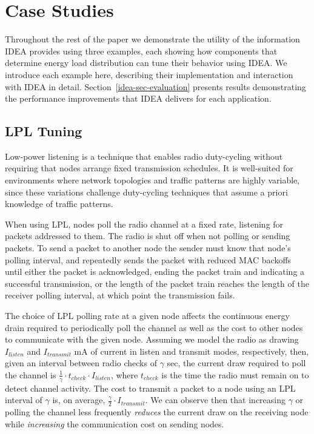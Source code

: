 \section{Case Studies}
\label{idea-sec-casestudies}

Throughout the rest of the paper we demonstrate the utility of the
information IDEA provides using three examples, each showing how components
that determine energy load distribution can tune their behavior using IDEA.
We introduce each example here, describing their implementation and
interaction with IDEA in detail. Section~\ref{idea-sec-evaluation} presents
results demonstrating the performance improvements that IDEA delivers for
each application.

\subsection{LPL Tuning}
\label{idea-subsec-lpltuning}

Low-power listening is a technique that enables radio duty-cycling without
requiring that nodes arrange fixed transmission schedules. It is well-suited
for environments where network topologies and traffic patterns are
highly variable, since these variations challenge duty-cycling techniques
that assume a priori knowledge of traffic patterns.

When using LPL, nodes poll the radio channel at a fixed rate, listening for
packets addressed to them. The radio is shut off when not polling or
sending packets. To send a packet to another node the sender must know that
node's polling interval, and repeatedly sends the packet with reduced MAC
backoffs until either the packet is acknowledged, ending the packet train and
indicating a successful transmission, or the length of the packet train
reaches the length of the receiver polling interval, at which point the
transmission fails.

The choice of LPL polling rate at a given node affects the continuous energy
drain required to periodically poll the channel as well as the cost to other
nodes to communicate with the given node. Assuming we model the radio as
drawing $I_{listen}$ and $I_{transmit}$ mA of current in listen and transmit
modes, respectively, then, given an interval between radio checks of $\gamma$
sec, the current draw required to poll the channel is $\frac{1}{\gamma} \cdot
t_{check} \cdot I_{listen}$, where $t_{check}$ is the time the radio must
remain on to detect channel activity. The cost to transmit a packet to a node
using an LPL interval of $\gamma$ is, on average, $\frac{\gamma}{2} \cdot
I_{transmit}$. We can observe then that increasing $\gamma$ or polling the
channel less frequently \textit{reduces} the current draw on the receiving
node while \textit{increasing} the communication cost on sending nodes.

